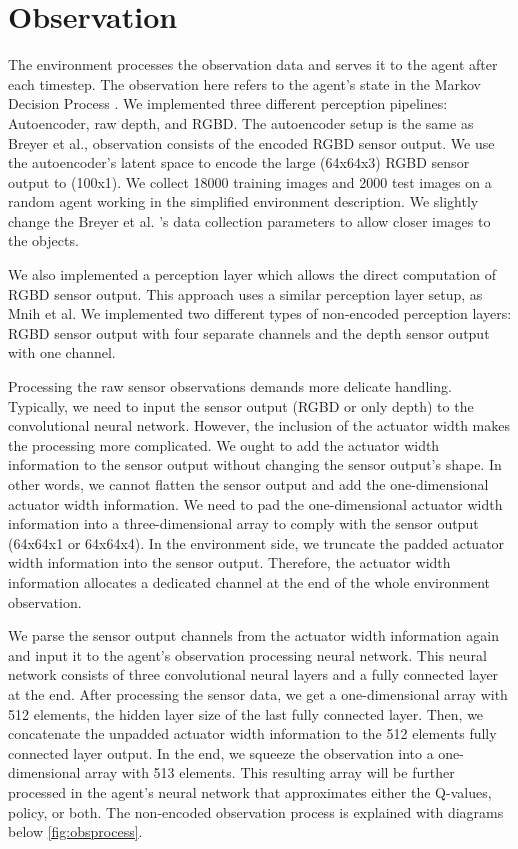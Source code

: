 \section{Observation}

The environment processes the observation data and serves it to the agent after each timestep. The observation here refers to the agent's state in the Markov Decision Process . We implemented three different perception pipelines: Autoencoder, raw depth, and RGBD. The autoencoder setup is the same as Breyer et al., observation consists of the encoded RGBD sensor output. We use the autoencoder's latent space to encode the large (64x64x3) RGBD sensor output to (100x1). We collect 18000 training images and 2000 test images on a random agent working in the simplified environment description. We slightly change the Breyer et al. 's data collection parameters to allow closer images to the objects.

We also implemented a perception layer which allows the direct computation of RGBD sensor output. This approach uses a similar perception layer setup, as Mnih et al. We implemented two different types of non-encoded perception layers: RGBD sensor output with four separate channels and the depth sensor output with one channel. 

Processing the raw sensor observations demands more delicate handling. Typically, we need to input the sensor output (RGBD or only depth) to the convolutional neural network. However, the inclusion of the actuator width makes the processing more complicated. We ought to add the actuator width information to the sensor output without changing the sensor output's shape. In other words, we cannot flatten the sensor output and add the one-dimensional actuator width information. We need to pad the one-dimensional actuator width information into a three-dimensional array to comply with the sensor output (64x64x1 or 64x64x4). In the environment side, we truncate the padded actuator width information into the sensor output. Therefore, the actuator width information allocates a dedicated channel at the end of the whole environment observation. 

We parse the sensor output channels from the actuator width information again and input it to the agent's observation processing neural network. This neural network consists of three convolutional neural layers and a fully connected layer at the end. After processing the sensor data, we get a one-dimensional array with 512 elements, the hidden layer size of the last fully connected layer. Then, we concatenate the unpadded actuator width information to the 512 elements fully connected layer output. In the end, we squeeze the observation into a one-dimensional array with 513 elements. This resulting array will be further processed in the agent's neural network that approximates either the Q-values, policy, or both. The non-encoded observation process is explained with diagrams below \ref{fig:obsprocess}.

